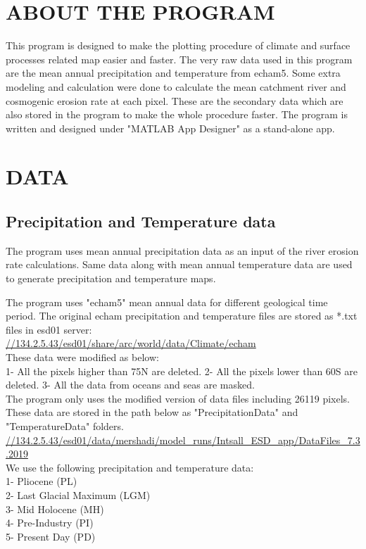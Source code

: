 \documentclass[11pt,a4paper,titlepage]{report}
\begin{document}
\chapter{ABOUT THE PROGRAM}
This program is designed to make the plotting procedure of climate and surface processes related map easier and faster. The very raw data used in this program are the mean annual precipitation and temperature from echam5. Some extra modeling and calculation were done to calculate the mean catchment river and cosmogenic erosion rate at each pixel. These are the secondary data which are also stored in the program to make the whole procedure faster. The program is written and designed under "MATLAB App Designer" as a stand-alone app.\\
\chapter{DATA}
\section{Precipitation and Temperature data}

The program uses mean annual precipitation data as an input of the river erosion rate calculations. Same data along with mean annual temperature data are used to generate precipitation and temperature maps.

The program uses "echam5" mean annual data for different geological time period. The original echam precipitation and temperature files are stored as *.txt files in esd01 server:\\
\url{//134.2.5.43/esd01/share/arc/world/data/Climate/echam}\\

These data were modified as below:\\
1- All the pixels higher than 75\degree N are deleted.
2- All the pixels lower than 60\degree S are deleted. 
3- All the data from oceans and seas are masked.\\

The program only uses the modified version of data files including 26119 pixels. These data are stored in the path below as "PrecipitationData" and "TemperatureData" folders.\\
\url{//134.2.5.43/esd01/data/mershadi/model_runs/Intsall_ESD_app/DataFiles_7.3.2019}\\

We use the following precipitation and temperature data:\\
1- Pliocene (PL)\\
2- Last Glacial Maximum (LGM)\\
3- Mid Holocene (MH)\\
4- Pre-Industry (PI)\\
5- Present Day (PD)\\ 
\end{document}
